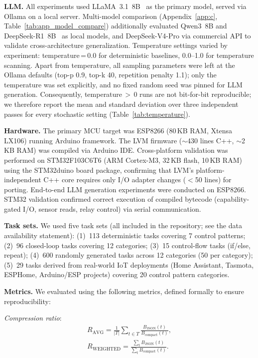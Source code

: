 \documentclass[a4paper,fleqn,longmktitle]{cas-dc}
\begin{document}
\textbf{LLM.} All experiments used LLaMA~3.1~8B~\citep{dubey2024llama} as the primary model, served via Ollama on a local server. Multi-model comparison (Appendix~\ref{app:c}, Table~\ref{tab:app_model_compare}) additionally evaluated Qwen3~8B and DeepSeek-R1~8B~\citep{guo2024deepseek} as local models, and DeepSeek-V4-Pro via commercial API to validate cross-architecture generalization. Temperature settings varied by experiment: temperature\,=\,0.0 for deterministic baselines, 0.0--1.0 for temperature scanning. Apart from temperature, all sampling parameters were left at the Ollama defaults (top-p 0.9, top-k 40, repetition penalty 1.1); only the temperature was set explicitly, and no fixed random seed was pinned for LLM generation. Consequently, temperature\,$>$\,0 runs are not bit-for-bit reproducible; we therefore report the mean and standard deviation over three independent passes for every stochastic setting (Table~\ref{tab:temperature}).

\textbf{Hardware.} The primary MCU target was ESP8266 (80\,KB RAM, Xtensa LX106) running Arduino framework. The LVM firmware ($\sim$430 lines C++, $\sim$2\,KB RAM) was compiled via Arduino IDE. Cross-platform validation was performed on STM32F103C6T6 (ARM Cortex-M3, 32\,KB flash, 10\,KB RAM) using the STM32duino board package, confirming that LVM's platform-independent C++ core requires only I/O adapter changes ($<$50 lines) for porting. End-to-end LLM generation experiments were conducted on ESP8266. STM32 validation confirmed correct execution of compiled bytecode (capability-gated I/O, sensor reads, relay control) via serial communication.

\textbf{Task sets.} We used five task sets (all included in the repository; see the data availability statement): (1)~113 deterministic tasks covering 7 control patterns; (2)~96 closed-loop tasks covering 12 categories; (3)~15 control-flow tasks (if/else, repeat); (4)~600 randomly generated tasks across 12 categories (50 per category); (5)~29 tasks derived from real-world IoT deployments (Home Assistant, Tasmota, ESPHome, Arduino/ESP projects) covering 20 control pattern categories.

\textbf{Metrics.} We evaluated using the following metrics, defined formally to ensure reproducibility:

\emph{Compression ratio}:
\[
\begin{gathered}
R_{\text{AVG}} = \frac{1}{|T|} \sum_{t \in T} \frac{B_{\text{JSON}}(t)}{B_{\text{compact}}(t)}, \\[4pt]
R_{\text{WEIGHTED}} = \frac{\sum_{t} B_{\text{JSON}}(t)}{\sum_{t} B_{\text{compact}}(t)}.
\end{gathered}
\]
\end{document}
